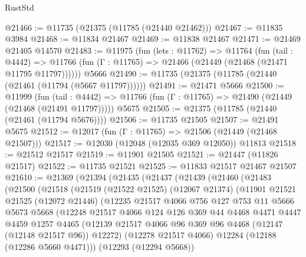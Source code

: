 \begin{lexlean}{RustStd}
\begin{coremodule}
@21466 := @11735 (@21375 (@11785 (@21440 @21462)))
@21467 := @11835 @3984
@21468 := @11834 @21467
@21469 := @11838 @21467
@21471 := @21469 @21405 @14570
@21483 := @11975
    (fun (lets : @11762) =>
    @11764
      (fun (tail : @4442) =>
      @11766 (fun (Γ : @11765) => @21466 (@21449 (@21468 (@21471 @11795 @11797))))))
    @5666
@21490 := @11735 (@21375 (@11785 (@21440 (@21461 (@11794 (@5667 @11797))))))
@21491 := @21471 @5666
@21500 := @11999
    (fun (tail : @4442) => @11766 (fun (Γ : @11765) => @21490 (@21449 (@21468 (@21491 @11797)))))
    @5675
@21505 := @21375 (@11785 (@21440 (@21461 (@11794 @5676))))
@21506 := @11735 @21505
@21507 := @21491 @5675
@21512 := @12017 (fun (Γ : @11765) => @21506 (@21449 (@21468 @21507)))
@21517 := @12030 (@12048 (@12035 @369 @12050)) @11813
@21518 := @21512 @21517
@21519 := @11901 @21505
@21521 := @21447 (@11826 @21517)
@21522 := @11735 @21521
@21525 := @11833 @21517 @21467 @21507
@21610 := @21369
    (@21394
      (@21435
        (@21437
          (@21439
            (@21460
              (@21483
                (@21500
                  (@21518
                    (@21519
                      (@21522 @21525)
                      (@12067 @21374)
                      (@11901
                        @21521
                        @21525
                        (@12072 @21446)
                        (@12235
                          @21517
                          @4066
                          @756
                          @127
                          @753
                          @11
                          @5666
                          @5673
                          @5668
                          (@12248
                            @21517
                            @4066
                            @124
                            @126
                            @369
                            @44
                            @4468
                            @4471
                            @4447
                            @4459
                            @1257
                            @4465
                            (@12139
                              @21517
                              @4066
                              @96
                              @369
                              @96
                              @4468
                              (@12147 (@12148 @21517 @96))
                              @12272)
                            (@12278 @21517 @4066)
                            @12284
                            (@12188 (@12286 @5660 @4471)))
                          (@12293 (@12294 @5668))

\end{coremodule}
\end{lexlean}
